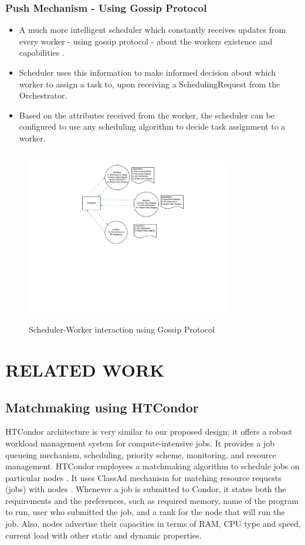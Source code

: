 \documentclass[sigconf]{acmart}
\begin{document}
\subsubsection{Push Mechanism - Using Gossip Protocol}
\begin{itemize}
\item A much more intelligent scheduler which constantly receives updates from every worker - using gossip protocol - about the workers existence and capabilities \cite{kermarrec2007gossiping}.
\item Scheduler uses this information to make informed decision about which worker to assign a task to, upon receiving a SchedulingRequest from the Orchestrator.
\item Based on the attributes received from the worker, the scheduler can be configured to use any scheduling algorithm to decide task assignment to a worker.
\end{itemize}

\begin{figure}
\includegraphics[height=3in, width=3.5in]{figures/scheduler-push-mechanism.pdf}
\caption{Scheduler-Worker interaction using Gossip Protocol}
\end{figure}

\section{RELATED WORK}

\subsection{Matchmaking using HTCondor}
HTCondor architecture is very similar to our proposed design; it offers a robust workload management system for compute-intensive jobs. It provides a job queueing mechanism, scheduling, priority scheme, monitoring, and resource management. HTCondor employees a matchmaking algorithm to schedule jobs on particular nodes \cite{coleman2001implementation}. It uses ClassAd mechanism for matching resource requests (jobs) with nodes \cite{coleman2003distributed}. Whenever a job is submitted to Condor, it states both the requirements and the preferences, such as required memory, name of the program to run, user who submitted the job, and a rank for the node that will run the job. Also, nodes advertise their capacities in terms of RAM, CPU type and speed, current load with other static and dynamic properties. \newline
\end{document}
